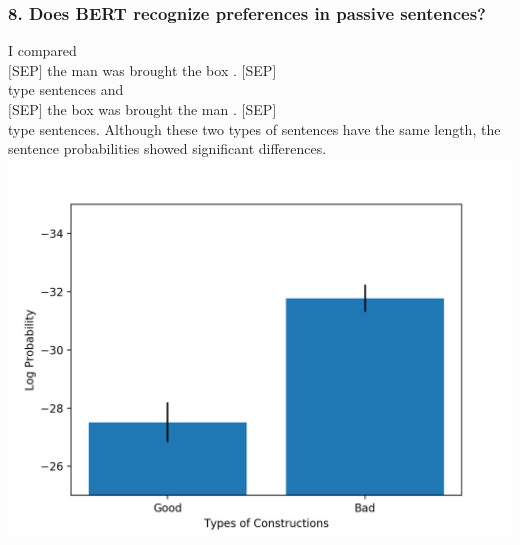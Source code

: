 \documentclass[twocolumn,dvipdfmx, 10pt]{article}
\begin{document}
\subsubsection*{8. Does BERT recognize preferences in passive sentences?}
I compared\\
$[$SEP$]$ the man was brought the box . $[$SEP$]$\\
type sentences and\\
$[$SEP$]$ the box was brought the man . $[$SEP$]$\\
type sentences.  Although these two types of sentences have the same length, the sentence probabilities showed significant differences.\\
\includegraphics[keepaspectratio,width = \linewidth]{passive_new.png}
\end{document}
